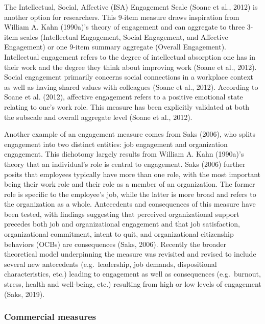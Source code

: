 \documentclass[
  man]{apa7}
\begin{document}
The Intellectual, Social, Affective (ISA) Engagement Scale (Soane et al., 2012) is another option for researchers. This 9-item measure draws inspiration from William A. Kahn (1990a)'s theory of engagement and can aggregate to three 3-item scales (Intellectual Engagement, Social Engagement, and Affective Engagement) or one 9-item summary aggregate (Overall Engagement). Intellectual engagement refers to the degree of intellectual absorption one has in their work and the degree they think about improving work (Soane et al., 2012). Social engagement primarily concerns social connections in a workplace context as well as having shared values with colleagues (Soane et al., 2012). According to Soane et al. (2012), affective engagement refers to a positive emotional state relating to one's work role. This measure has been explicitly validated at both the subscale and overall aggregate level (Soane et al., 2012).

Another example of an engagement measure comes from Saks (2006), who splits engagement into two distinct entities: job engagement and organization engagement. This dichotomy largely results from William A. Kahn (1990a)'s theory that an individual's role is central to engagement. Saks (2006) further posits that employees typically have more than one role, with the most important being their work role and their role as a member of an organization. The former role is specific to the employee's job, while the latter is more broad and refers to the organization as a whole. Antecedents and consequences of this measure have been tested, with findings suggesting that perceived organizational support precedes both job and organizational engagement and that job satisfaction, organizational commitment, intent to quit, and organizational citizenship behaviors (OCBs) are consequences (Saks, 2006). Recently the broader theoretical model underpinning the measure was revisited and revised to include several new antecedents (e.g.~leadership, job demands, dispositional characteristics, etc.) leading to engagement as well as consequences (e.g.~burnout, stress, health and well-being, etc.) resulting from high or low levels of engagement (Saks, 2019).

\hypertarget{commercial-measures}{%
\subsubsection{Commercial measures}\label{commercial-measures}}
\end{document}

